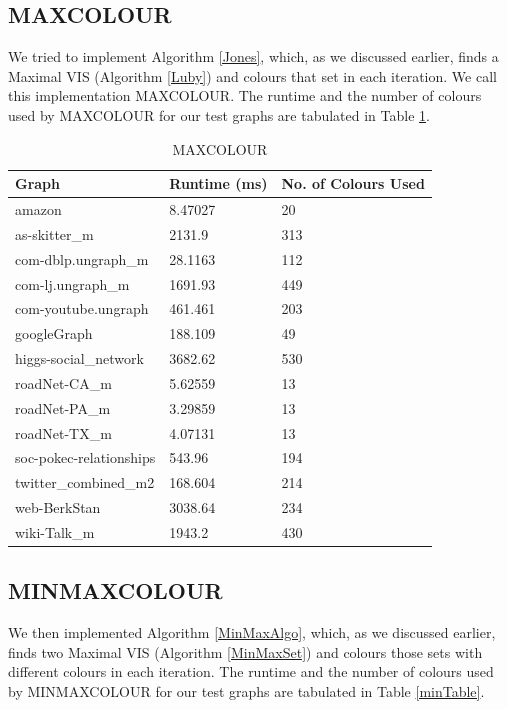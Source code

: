 \documentclass[MTech]{iitmdiss}
\begin{document}
\subsection{MAXCOLOUR}
We tried to implement Algorithm \ref{Jones}, which, as we discussed earlier, finds a Maximal VIS (Algorithm \ref{Luby}) and colours that set in each iteration. We call this implementation MAXCOLOUR. The runtime and the number of colours used by MAXCOLOUR for our test graphs are tabulated in Table \ref{maxTable}.

\begin{table}[]
\centering

\begin{tabular}{|l|l|l|}
\hline
Graph                   & Runtime (ms) & No. of Colours Used \\ \hline
amazon                  & 8.47027      & 20                  \\ \hline
as-skitter\_m           & 2131.9       & 313                 \\ \hline
com-dblp.ungraph\_m     & 28.1163      & 112                 \\ \hline
com-lj.ungraph\_m       & 1691.93      & 449                 \\ \hline
com-youtube.ungraph     & 461.461      & 203                 \\ \hline
googleGraph             & 188.109      & 49                  \\ \hline
higgs-social\_network   & 3682.62      & 530                 \\ \hline
roadNet-CA\_m           & 5.62559      & 13                  \\ \hline
roadNet-PA\_m           & 3.29859      & 13                  \\ \hline
roadNet-TX\_m           & 4.07131      & 13                  \\ \hline
soc-pokec-relationships & 543.96       & 194                 \\ \hline
twitter\_combined\_m2   & 168.604      & 214                 \\ \hline
web-BerkStan            & 3038.64      & 234                 \\ \hline
wiki-Talk\_m            & 1943.2       & 430                 \\ \hline
\end{tabular}
\caption{MAXCOLOUR}
\label{maxTable}
\end{table}

\subsection{MINMAXCOLOUR}
We then implemented Algorithm \ref{MinMaxAlgo}, which, as we discussed earlier, finds two Maximal VIS (Algorithm \ref{MinMaxSet}) and colours those sets with different colours in each iteration. The runtime and the number of colours used by MINMAXCOLOUR for our test graphs are tabulated in Table \ref{minTable}.
\end{document}
